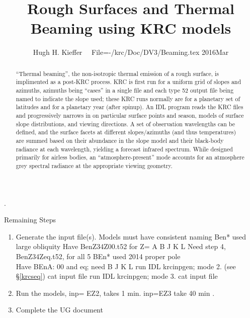 \documentclass{article}
\title{Rough Surfaces and Thermal Beaming using KRC models}
\author{Hugh H. Kieffer  \ \ File=-/krc/Doc/DV3/Beaming.tex  2016Mar}
\begin{document}
\maketitle 
\setlength{\baselineskip}{8.pt} 
\tableofcontents
\listoffigures
\listoftables
\setlength{\baselineskip}{12.pt} 
\hrulefill .\hrulefill

\begin{abstract}
``Thermal beaming'', the non-isotropic thermal emission of a rough surface, is
  implimented as a post-KRC process.  KRC is first run for a uniform grid of
  slopes and azimuths, azimuths being ``cases'' in a single file and each type
  52 output file being named to indicate the slope used; these KRC runs normally
  are for a planetary set of latitudes and for a planetary year (after
  spinup). An IDL program reads the KRC files and progressively narrows in on
  particular surface points and season, models of surface slope distributions,
  and viewing directions. A set of observation wavelengths can be defined, and
  the surface facets at different slopes/azimuths (and thus temperatures) are
  summed based on their abundance in the slope model and their black-body
  radiance at each wavelength, yielding a forecast infrared spectrum. While
  designed primarily for airless bodies, an ``atmosphere-present'' mode accounts
  for an atmosphere grey spectral radiance at the appropriate viewing geometry.
\end{abstract}

Remaining Steps \begin{enumerate}    %
 \item Generate the input file(s). Models must have consistent naming
\qi Ben* used large obliquity
\qii Have BenZ34Z00.t52 for  Z= A B J K L
\qii Need step 4, BenZ34Zeq.t52, for all 5
\qi BEn* used 2014 proper pole
\\ Have BEnA: 00 and eq; need B J K L
\qi run IDL krcinpgen;  mode 2. (see \S \ref{krcseq}) cat input file
\qi run IDL krcinpgen;  mode 3.  cat input file
 \item Run the models, inp= EZ2, takes 1 min.  inp=EZ3 take 40 min .
 \item Complete the UG document
\end{enumerate}
\end{document}

